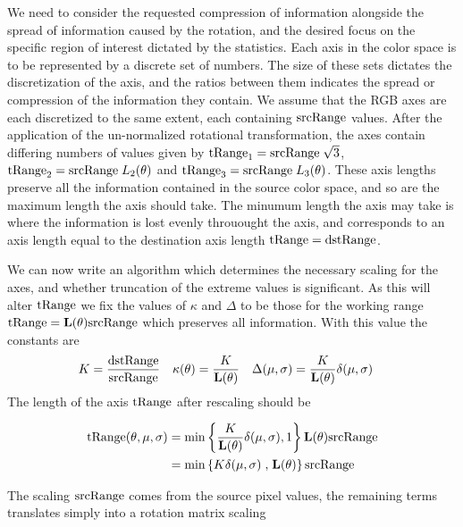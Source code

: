 We need to consider the requested compression of information alongside the spread of information caused by the rotation, and the desired focus on the specific region of interest dictated by the statistics. Each axis in the color space is to be represented by a discrete set of numbers. The size of these sets dictates the discretization of the axis, and the ratios between them indicates the spread or compression of the information they contain. We assume that the RGB axes are each discretized to the same extent, each containing $\text{srcRange}$ values. After the application of the un-normalized rotational transformation, the axes contain differing numbers of values given by $\text{tRange}_1 =\text{srcRange} \; \sqrt{3} $, $\text{tRange}_2 = \text{srcRange} \; L_2(\theta) $  and $\text{tRange}_3 = \text{srcRange} \; L_3(\theta)$. These axis lengths preserve all the information contained in the source color space, and so are the maximum length the axis should take. The minumum length the axis may take is where the information is lost evenly throuought the axis, and corresponds to an axis length equal to the destination axis length $\text{tRange} = \text{dstRange}$. 

We can now write an algorithm which determines the necessary scaling for the axes, and whether truncation of the extreme values is significant.
As this will alter $\text{tRange}$ we fix the values of $\kappa$ and $\Delta$ to be those for the working range $\text{tRange} = \mathbf{L}(\theta) \text{srcRange}$  which preserves all information. With this value the constants are
\begin{align}
K & =  \frac{\text{dstRange}}{\text{srcRange}}  &
\kappa(\theta) &=  \frac{K}{\mathbf{L}(\theta)}  & 
\Delta(\mu,\sigma)  &= \frac{K}{\mathbf{L}(\theta)} \delta(\mu,\sigma)  
\end{align}
The length of the axis $\text{tRange}$ after rescaling should be

\begin{equation}\label{eq:CombinedRotationRange}
\begin{aligned}
 \text{tRange}(\theta,\mu,\sigma) &= \min\left\{ \frac{K}{\mathbf{L}(\theta)}   \delta(\mu,\sigma) , 1 \right\} \mathbf{L}(\theta) \text{srcRange}  \\
  & =  \min\left\{K \delta(\mu,\sigma) \right. ,  \left. \mathbf{L}(\theta) \right\}  \text{srcRange}
\end{aligned}
\end{equation}

The scaling $\text{srcRange}$ comes from the source pixel values, the remaining terms translates simply into a rotation matrix scaling

